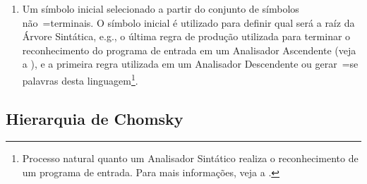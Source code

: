 \begin{enumerate}
    \item Um símbolo inicial selecionado a partir do conjunto de símbolos não~=terminais.
    O símbolo inicial é utilizado para definir qual será a raíz da Árvore Sintática,
    e.g.,
    o última regra de produção utilizada para terminar o reconhecimento do programa de entrada em um Analisador Ascendente (veja a ),
    e a primeira regra utilizada em um Analisador Descendente ou
    gerar~=se palavras desta linguagem\footnote{
    Processo natural quanto um Analisador Sintático realiza o reconhecimento de um programa de entrada.
    Para mais informações,
    veja a .
    }.
\end{enumerate}


\subsection{Hierarquia de Chomsky}
\label{hierarquiaDeChomsky}

